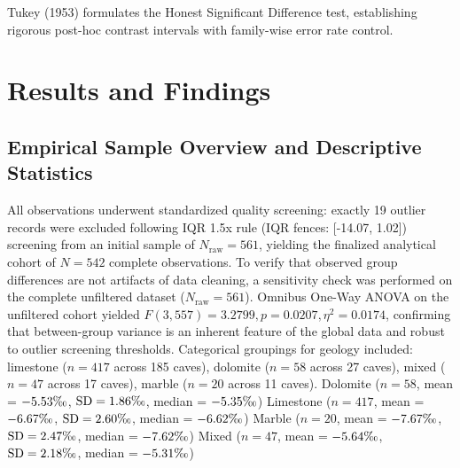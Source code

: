 \documentclass[sn-basic,Numbered]{sn-jnl}%
\begin{document}
Tukey (1953) formulates the Honest Significant Difference test, establishing rigorous post-hoc contrast intervals with family-wise error rate control. \cite{tukey1953_30}

\section{Results and Findings}
\label{sec:results}
\subsection{Empirical Sample Overview and Descriptive Statistics}
All observations underwent standardized quality screening: exactly 19 outlier records were excluded following IQR 1.5x rule (IQR fences: [-14.07, 1.02]) screening from an initial sample of $N_{\text{raw}} = 561$, yielding the finalized analytical cohort of $N = 542$ complete observations. To verify that observed group differences are not artifacts of data cleaning, a sensitivity check was performed on the complete unfiltered dataset ($N_{\text{raw}} = 561$). Omnibus One-Way ANOVA on the unfiltered cohort yielded $F(3, 557) = 3.2799, p = 0.0207, \eta^2 = 0.0174$, confirming that between-group variance is an inherent feature of the global data and robust to outlier screening thresholds. Categorical groupings for geology included: limestone ($n = 417$ across 185 caves), dolomite ($n = 58$ across 27 caves), mixed ($n = 47$ across 17 caves), marble ($n = 20$ across 11 caves). Dolomite ($n = 58$, mean = $-5.53\text{\textperthousand}$, $\text{SD} = 1.86\text{\textperthousand}$, median = $-5.35\text{\textperthousand}$) Limestone ($n = 417$, mean = $-6.67\text{\textperthousand}$, $\text{SD} = 2.60\text{\textperthousand}$, median = $-6.62\text{\textperthousand}$) Marble ($n = 20$, mean = $-7.67\text{\textperthousand}$, $\text{SD} = 2.47\text{\textperthousand}$, median = $-7.62\text{\textperthousand}$) Mixed ($n = 47$, mean = $-5.64\text{\textperthousand}$, $\text{SD} = 2.18\text{\textperthousand}$, median = $-5.31\text{\textperthousand}$)
\end{document}
